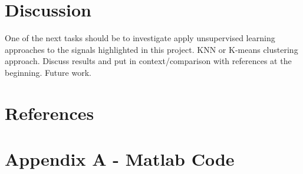\documentclass{article}
\begin{document}
\section{Discussion} 
One of the next tasks should be to investigate apply unsupervised learning approaches to the signals highlighted in this project.
KNN or
K-means clustering approach.
Discuss results and put in context/comparison with references at the beginning. Future work.
\clearpage
\section{References} 
\printbibliography[heading=none] 
\clearpage  
\section{Appendix A - Matlab Code}
\UseRawInputEncoding


%
\end{document}
